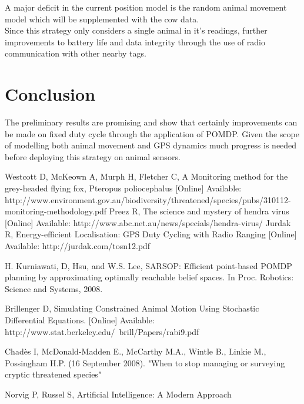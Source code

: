 \documentclass[12pt,openany,a4paper]{book}
\begin{document}
A major deficit in the current position model is the random animal movement model which will be supplemented with the cow data.\\

Since this strategy only considers a single animal in it's readings, further improvements to battery life and data integrity through the use of radio communication with other nearby tags. 


\chapter{Conclusion}
The preliminary results are promising and show that certainly improvements can be made on fixed duty cycle through the application of POMDP. Given the scope of modelling both animal movement and GPS dynamics much progress is needed before deploying this strategy on animal sensors.


\begin{thebibliography}{99}
 Westcott D, McKeown A, Murph H, Fletcher C, A Monitoring method for the grey-headed flying fox, Pteropus poliocephalus [Online] Available: http://www.environment.gov.au/biodiversity/threatened/species/pubs/310112-monitoring-methodology.pdf
 Preez R, The science and mystery of hendra virus [Online] Available: http://www.abc.net.au/news/specials/hendra-virus/
 Jurdak R, Energy-efficient Localisation: GPS Duty Cycling with Radio Ranging [Online] Available: http://jurdak.com/tosn12.pdf

H. Kurniawati, D, Hsu, and W.S. Lee, SARSOP: Efficient point-based POMDP planning by approximating optimally reachable belief spaces. In Proc. Robotics: Science and Systems, 2008. 

 Brillenger D, Simulating Constrained Animal Motion Using Stochastic Differential Equations. [Online] Available: http://www.stat.berkeley.edu/~brill/Papers/rabi9.pdf

 Chadès I, McDonald-Madden E., McCarthy M.A., Wintle B., Linkie M., Possingham H.P. (16 September 2008). "When to stop managing or surveying cryptic threatened species"

 Norvig P, Russel S, Artificial Intelligence: A Modern Approach

\end{thebibliography}
\end{document}
